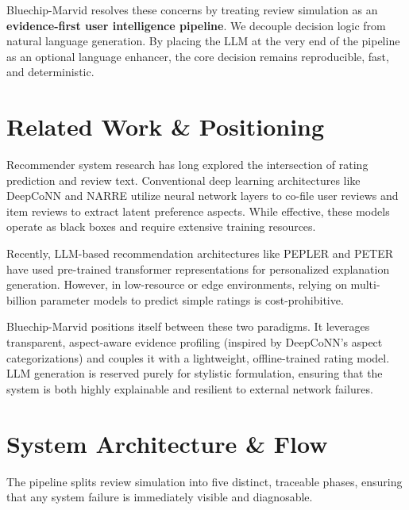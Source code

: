 \documentclass[11pt,a4paper]{article}
\begin{document}
Bluechip-Marvid resolves these concerns by treating review simulation as an \textbf{evidence-first user intelligence pipeline}. We decouple decision logic from natural language generation. By placing the LLM at the very end of the pipeline as an optional language enhancer, the core decision remains reproducible, fast, and deterministic.

\section{Related Work \& Positioning}
Recommender system research has long explored the intersection of rating prediction and review text. Conventional deep learning architectures like DeepCoNN \cite{deepconn} and NARRE \cite{narre} utilize neural network layers to co-file user reviews and item reviews to extract latent preference aspects. While effective, these models operate as black boxes and require extensive training resources. 

Recently, LLM-based recommendation architectures like PEPLER \cite{pepler} and PETER \cite{peter} have used pre-trained transformer representations for personalized explanation generation. However, in low-resource or edge environments, relying on multi-billion parameter models to predict simple ratings is cost-prohibitive.

Bluechip-Marvid positions itself between these two paradigms. It leverages transparent, aspect-aware evidence profiling (inspired by DeepCoNN's aspect categorizations) and couples it with a lightweight, offline-trained rating model. LLM generation is reserved purely for stylistic formulation, ensuring that the system is both highly explainable and resilient to external network failures.

\section{System Architecture \& Flow}
The pipeline splits review simulation into five distinct, traceable phases, ensuring that any system failure is immediately visible and diagnosable.
\end{document}
